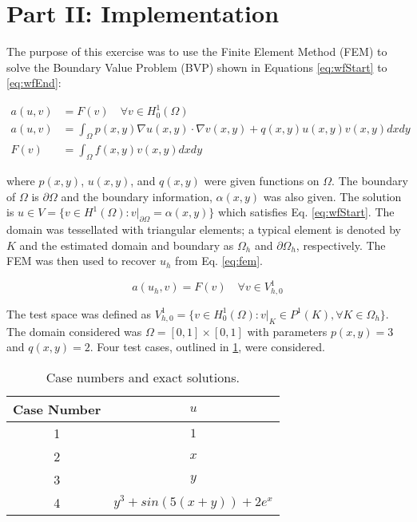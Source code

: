 \documentclass[a4paper, 12pt]{article}
\title{}
\begin{document}
\section*{Part II: Implementation} \label{sec:intro}
The purpose of this exercise was to use the Finite Element Method (FEM)
to solve the Boundary Value Problem (BVP) shown in Equations \ref{eq:wfStart}
to \ref{eq:wfEnd}:


\begin{align}
a( u, v) &= F(v) \quad \forall v \in H_0^1(\Omega) \label{eq:wfStart} \\
a( u, v) &= \int_{\Omega} p( x, y) \nabla u( x, y)  \cdot \nabla v( x, y) + q( x, y) u( x, y) v( x, y) dx dy \\
F(v)     &= \int_{\Omega} f( x, y) v( x, y) dxdy \label{eq:wfEnd}
\end{align}

\noindent
where $p(x,y)$, $u(x,y)$, and $q(x,y)$ were given functions on $\Omega$.
The boundary of $\Omega$ is $\partial \Omega$ and the boundary
information, $\alpha( x, y)$ was also given.
The solution is $u \in V = \{ v\in H^1(\Omega):v\rvert_{\partial \Omega} = \alpha( x, y)\}$
which satisfies Eq. \ref{eq:wfStart}. 
The domain was tessellated with triangular elements;
a typical element is denoted by $K$ and the estimated 
domain and boundary as $\Omega_h$ and $\partial \Omega_h$, respectively.
The FEM was then used to recover $u_h$ from Eq. \ref{eq:fem}.

\begin{equation}
a( u_h, v) = F( v) \quad \forall v \in V_{h,0}^1  \label{eq:fem}
\end{equation}

\noindent
The test space was defined as
$V_{h,0}^1 = \{v \in H_0^1(\Omega): v\rvert_{K} \in P^1(K), \forall K \in \Omega_h\}$.
The domain considered was $\Omega = [0, 1] \times [0,1]$ with 
parameters $p(x,y) = 3$ and $q(x,y) = 2$.  
Four test cases, outlined in \ref{t:cases}, were considered.


\begin{table}[!ht]
\caption{ Case numbers and exact solutions.}
\vspace{0.1in}
\centering
\begin{tabular}{ |c|c|}
  \hline
  Case Number  & $u$ \\
  \hline
  1            &  $1$ \\
  \hline
  2            &  $x$ \\
  \hline
  3            &  $y$ \\
  \hline
  4            &  $y^3 + sin( 5(x+y)) + 2e^x$ \\
  \hline
\end{tabular}
\label{t:cases}
\end{table}
\end{document}
